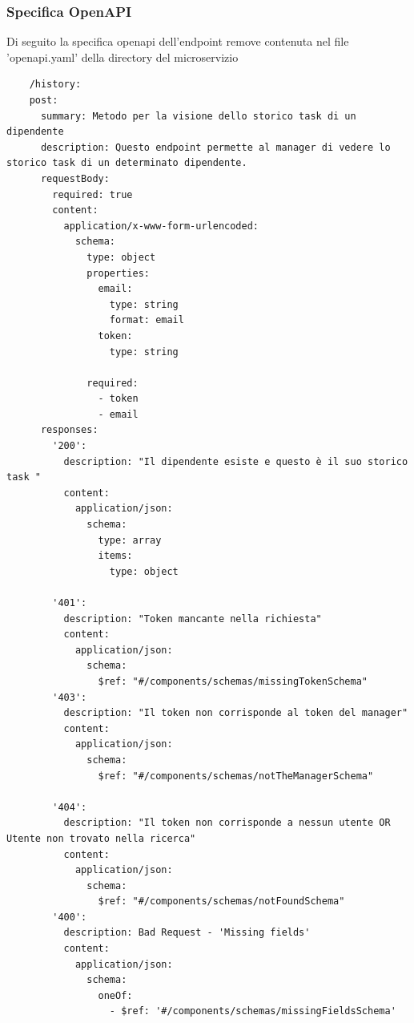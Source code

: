 \documentclass{report}
\begin{document}
\subsubsection*{Specifica OpenAPI}
Di seguito la specifica openapi dell'endpoint remove contenuta nel file 'openapi.yaml' della directory del microservizio
\begin{verbatim}
	/history:
    post:
      summary: Metodo per la visione dello storico task di un dipendente
      description: Questo endpoint permette al manager di vedere lo storico task di un determinato dipendente.
      requestBody:
        required: true
        content:
          application/x-www-form-urlencoded:
            schema:
              type: object
              properties:
                email:
                  type: string
                  format: email
                token:
                  type: string
               
              required:
                - token
                - email
      responses:
        '200':
          description: "Il dipendente esiste e questo è il suo storico task "
          content:
            application/json:
              schema:
                type: array
                items:
                  type: object
                  
        '401':
          description: "Token mancante nella richiesta"
          content:
            application/json:
              schema:
                $ref: "#/components/schemas/missingTokenSchema"
        '403':
          description: "Il token non corrisponde al token del manager"
          content:
            application/json:
              schema:
                $ref: "#/components/schemas/notTheManagerSchema"

        '404':
          description: "Il token non corrisponde a nessun utente OR Utente non trovato nella ricerca"
          content:
            application/json:
              schema:
                $ref: "#/components/schemas/notFoundSchema"
        '400':
          description: Bad Request - 'Missing fields' 
          content:
            application/json:
              schema:
                oneOf:
                  - $ref: '#/components/schemas/missingFieldsSchema'
\end{verbatim}
\end{document}
